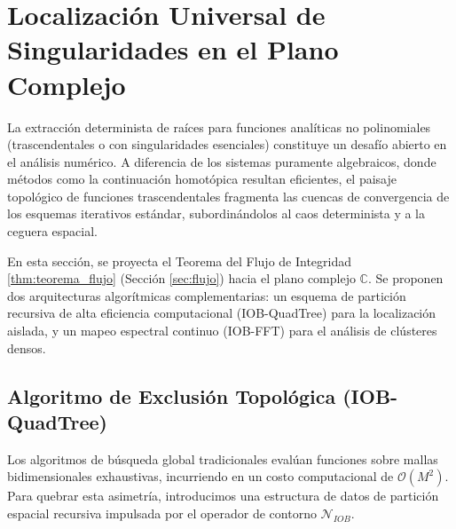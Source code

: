 \documentclass[11pt]{article}
\begin{document}
\newpage
\section{Localización Universal de Singularidades en el Plano Complejo}
\label{sec:loc_universal}

La extracción determinista de raíces para funciones analíticas no polinomiales (trascendentales o con singularidades esenciales) constituye un desafío abierto en el análisis numérico. A diferencia de los sistemas puramente algebraicos, donde métodos como la continuación homotópica resultan eficientes, el paisaje topológico de funciones trascendentales fragmenta las cuencas de convergencia de los esquemas iterativos estándar, subordinándolos al caos determinista y a la ceguera espacial.

En esta sección, se proyecta el Teorema del Flujo de Integridad \ref{thm:teorema_flujo} (Sección \ref{sec:flujo}) hacia el plano complejo $\mathbb{C}$. Se proponen dos arquitecturas algorítmicas complementarias: un esquema de partición recursiva de alta eficiencia computacional (IOB-QuadTree) para la localización aislada, y un mapeo espectral continuo (IOB-FFT) para el análisis de clústeres densos.

\subsection{Algoritmo de Exclusión Topológica (IOB-QuadTree)}

Los algoritmos de búsqueda global tradicionales evalúan funciones sobre mallas bidimensionales exhaustivas, incurriendo en un costo computacional de $\mathcal{O}(M^2)$. Para quebrar esta asimetría, introducimos una estructura de datos de partición espacial recursiva impulsada por el operador de contorno $\mathcal{N}_{IOB}$.
\end{document}
